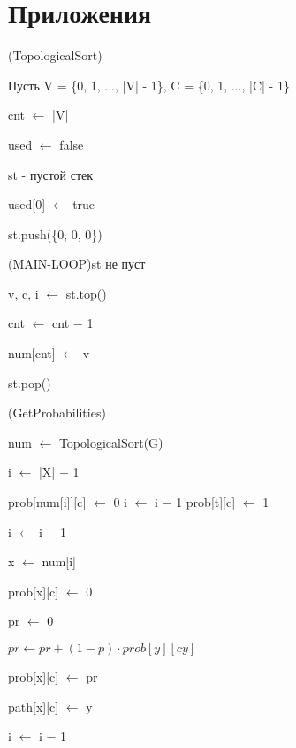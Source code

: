 \section*{Приложения}
\begin{algorithm}
	\Begin(TopologicalSort){
		\par Пусть V = \{0, 1, ..., |V| - 1\}, C = \{0, 1, ..., |C| - 1\}
		\par cnt $\leftarrow$ |V|
		\par used $\leftarrow$ false
		\par st - пустой стек
		
		\par used[0] $\leftarrow$ true
		\par st.push(\{0, 0, 0\})
		
		\While(MAIN-LOOP){st не пуст}
		{
			v, c, i $\leftarrow$ st.top()
			\par
			\par cnt $\leftarrow$ cnt $-$ 1
			\par num[cnt] $\leftarrow$ v
			\par st.pop()
		}
	}
\end{algorithm}

\begin{algorithm}
	\Begin(GetProbabilities){
		num $\gets$ TopologicalSort(G)
				
		i $\gets$ |X| $-$ 1
		
		{	
			{
				prob[num[i]][c] $\gets$ 0
			}
			i $\gets$ i $-$ 1
		}
		{
			prob[t][c] $\gets$ 1
		}
		
		i $\gets$ i $-$ 1
		
		{
			x $\gets$ num[i]
			
			{
				prob[x][c] $\gets$ 0
				
				{
					pr $\gets$ 0
					
					{
						{
							$pr \gets pr + (1-p) \cdot prob[y][cy]$
						}
					}
					{
						prob[x][c] $\gets$ pr
						
						path[x][c] $\gets$ y
					}
				}
			}
			
			i $\gets$ i $-$ 1
		}
	}
\end{algorithm}

